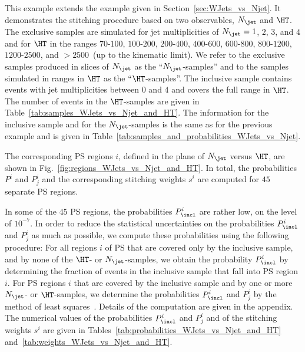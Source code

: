 This example extends the example given in Section~\ref{sec:WJets_vs_Njet}.
It demonstrates the stitching procedure based on two observables, $N_{\jet}$ and $\HT$.
The exclusive samples are simulated for jet multiplicities of $N_{\jet} = 1$, $2$, $3$, and $4$ 
and for $\HT$ in the ranges $70$-$100$, $100$-$200$, $200$-$400$, $400$-$600$, $600$-$800$, $800$-$1200$, $1200$-$2500$, and $> 2500$~\GeV (up to the kinematic limit).
We refer to the exclusive samples produced in slices of $N_{\jet}$ as the ``$N_{\jet}$-samples''
and to the samples simulated in ranges in $\HT$ as the ``$\HT$-samples''.
The inclusive sample contains events with jet multiplicities between $0$ and $4$ and covers the full range in $\HT$.
The number of events in the $\HT$-samples are given in Table~\ref{tab:samples_WJets_vs_Njet_and_HT}.
The information for the inclusive sample and for the $N_{\jet}$-samples is the same as for the previous example
and is given in Table~\ref{tab:samples_and_probabilities_WJets_vs_Njet}.

The corresponding PS regions $i$, defined in the plane of $N_{\jet}$ versus $\HT$, are shown in Fig.~\ref{fig:regions_WJets_vs_Njet_and_HT}.
In total, the probabilities $P^{i}$ and $P_{j}^{i}$ and the corresponding stitching weights $s^{i}$ are computed for $45$ separate PS regions.

In some of the $45$ PS regions, the probabilities $P_{\incl}^{i}$ are rather low, on the level of $10^{-7}$.
In order to reduce the statistical uncertainties on the probabilities $P_{\incl}^{i}$ and $P_{j}^{i}$ as much as possible,
we compute these probabilities using the following procedure:
For all regions $i$ of PS that are covered only by the inclusive sample, and by none of the $\HT$- or $N_{\jet}$-samples,
we obtain the probability $P_{\incl}^{i}$ by determining the fraction of events in the inclusive sample that fall into PS region $i$.
For PS regions $i$ that are covered by the inclusive sample and by one or more $N_{\jet}$- or $\HT$-samples,
we determine the probabilities $P_{\incl}^{i}$ and $P_{j}^{i}$ by the method of least squares~\cite{Cowan:1998ji}.
Details of the computation are given in the appendix.
The numerical values of the probabilities $P_{\incl}^{i}$ and $P_{j}^{i}$ and of the stitching weights $s^{i}$ are given in Tables~\ref{tab:probabilities_WJets_vs_Njet_and_HT}
and~\ref{tab:weights_WJets_vs_Njet_and_HT}.

